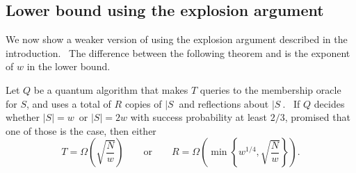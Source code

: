 %
\subsection{Lower bound using the explosion argument}
\label{s:explosion}\label{sec:explosion}

We now show a weaker version of  using the explosion argument
described in the introduction. \ The difference between the following
theorem and  is the exponent of $w$ in the lower bound.

\begin{theorem}
\label{thm:explosion}Let $Q$ be a quantum algorithm that makes $T$ queries
to the membership oracle for $S$, and uses a total of $R$ copies of $|S\>$
and reflections about $|S\>$. \ If $Q$ decides whether $\left\vert
S\right\vert =w$\ or $\left\vert S\right\vert =2w$ with success probability
at least $2/3$, promised that one of those is the case, then either
\begin{equation}
T=\Omega \left( \sqrt{\frac{N}{w}}\right) \qquad \text{or}\qquad R=\Omega
\left( \min \left\{ w^{1/4},\sqrt{\frac{N}{w}}\right\} \right) .
\end{equation}
\end{theorem}

